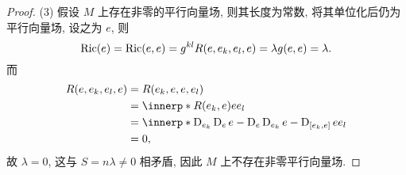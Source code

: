 \begin{proof}
  (3) 假设 $M$ 上存在非零的平行向量场, 则其长度为常数, 将其单位化后仍为平行向量场, 设之为 $e$, 则
  \[\operatorname{Ric}(e) = \operatorname{Ric}(e,e) = g^{kl}R(e,e_k,e_l,e) = \lambda g(e,e) = \lambda.\]
  而
  \begin{align*}
    R(e,e_k,e_l,e)
    & = R(e_k,e,e,e_l) \\
    & = \innerp*{R(e_k,e)e}{e_l} \\
    & = \innerp*{\D_{e_k}\D_e e - \D_e\D_{e_k} e - \D_{[e_k,e]}e}{e_l} \\
    & = 0,
  \end{align*}
  故 $\lambda=0$, 这与 $S=n\lambda\neq 0$ 相矛盾,
  因此 $M$ 上不存在非零平行向量场.
\end{proof}